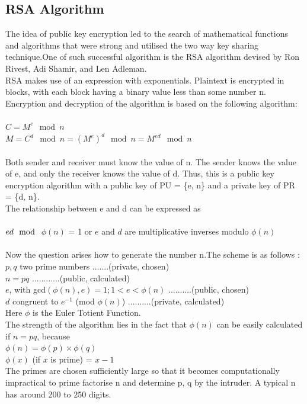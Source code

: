 \documentclass{article}
\begin{document}
\subsection{RSA Algorithm}
The idea of public key encryption led to the search of mathematical functions and algorithms that were strong and utilised the two way key sharing technique.One of such successful algorithm is the RSA algorithm devised by Ron Rivest, Adi Shamir, and Len Adleman.\\
RSA makes use of an expression with exponentials. Plaintext is encrypted in blocks, with each block having a binary value less than some number n. Encryption and decryption of the algorithm is based on the following algorithm:\\\\
$C = M^e \mod n$\\
$M = C^d \mod n = (M^e)^d \mod n= M^{ed} \mod n$\\\\
Both sender and receiver must know the value of n. The sender knows the value of e, and only the receiver knows the value of d. Thus, this is a public key encryption algorithm with a public key of PU = \{e, n\} and a private key of PR = \{d, n\}.\\
The relationship between e and d can be expressed as \\\\
$ ed \mod$ $\phi(n)$ = 1 or $e$ and $d$ are multiplicative inverses modulo $\phi(n)$\\\\
Now the question arises how to generate the number n.The scheme is as follows :\\
$p, q$ two prime numbers .......(private, chosen)\\
$n = pq$				............(public, calculated)\\
$e$, with gcd$(\phi(n), e) = 1; 1 < e < \phi(n)$ ..........(public, chosen)\\
$d$ congruent to $e^{-1}$ (mod $\phi(n)$)	..........(private, calculated)\\
Here $\phi$ is the Euler Totient Function.\\
The strength of the algorithm lies in the fact that $\phi(n)$ can be easily calculated if $n = pq $, because \\
$\phi(n) = \phi(p)\times\phi(q)$\\
$\phi(x)$ (if $x$ is prime) = $x-1$\\
The primes are chosen sufficiently large so that it becomes computationally impractical to prime factorise n and determine p, q by the intruder. A typical n has around 200 to 250 digits.
\end{document}
